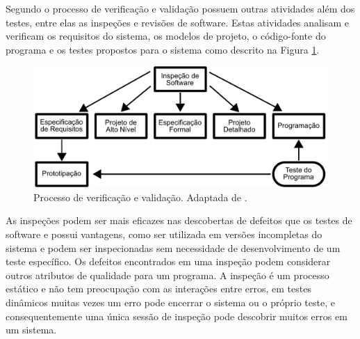 Segundo \citet{sommerville2010} o  processo de verificação e validação possuem outras atividades além dos testes, entre elas as inspeções e revisões de software. Estas atividades analisam e verificam os requisitos do sistema, os modelos de projeto, o código-fonte do programa e os testes propostos para o sistema como descrito na Figura \ref{fig:ver&val}. 

\begin{figure}[ht]
\centering
\includegraphics[scale=0.7]{imagens/validacao_verificacao.pdf}
\caption{Processo de verificação e validação. Adaptada de \cite{sommerville2010}.}
\label{fig:ver&val}
\end{figure}

As inspeções podem ser mais eficazes nas descobertas de defeitos que os testes de software e possui vantagens, como ser utilizada em  versões incompletas do sistema e podem ser inspecionadas sem necessidade de desenvolvimento de um teste específico. Os defeitos encontrados em uma inspeção podem considerar outros atributos de qualidade para um programa. A inspeção é um processo estático e não  tem  preocupação com as interações entre erros, em testes dinâmicos muitas vezes um erro pode encerrar o sistema ou o próprio teste, e consequentemente uma única sessão de inspeção pode descobrir muitos erros em um sistema. 
% 
% 
% 

